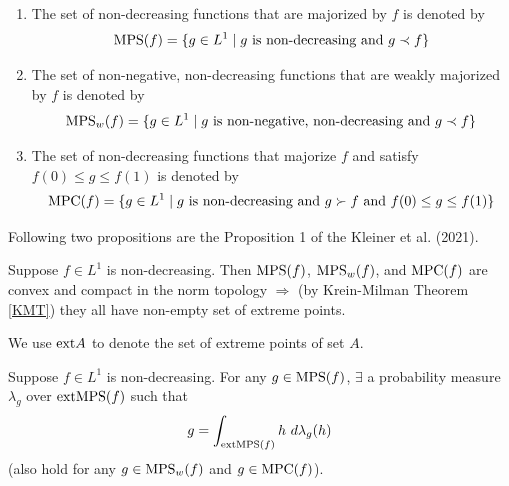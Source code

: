\documentclass[11pt]{elegantbook}
\begin{document}
\begin{definition}
    \normalfont
    \begin{enumerate}
        \item The set of non-decreasing functions that are majorized by $f$ is denoted by $$\textnormal{MPS}(f)=\{g\in L^1\mid g \textnormal{ is non-decreasing and }g\prec f\}$$
        \item The set of non-negative, non-decreasing functions that are weakly majorized by $f$ is denoted by $$\textnormal{MPS}_w(f)=\{g\in L^1\mid g \textnormal{ is non-negative,  non-decreasing and }g\prec f\}$$
        \item The set of non-decreasing functions that majorize $f$ and satisfy $f(0)\leq g\leq f(1)$ is denoted by $$\textnormal{MPC}(f)=\{g\in L^1\mid g \textnormal{ is non-decreasing and }g\succ f \textnormal{ and }f(0)\leq g\leq f(1)\}$$
    \end{enumerate}
\end{definition}

Following two propositions are the Proposition 1 of the Kleiner et al. (2021).
\begin{proposition}
    Suppose $f\in L^1$ is non-decreasing. Then $\textnormal{MPS}(f)$, $\textnormal{MPS}_w(f)$, and $\textnormal{MPC}(f)$ are convex and compact in the norm topology $\Rightarrow$ (by Krein-Milman Theorem \ref{KMT}) they all have non-empty set of extreme points.
\end{proposition}
\begin{note}
    We use $\textnormal{ext} A$ to denote the set of extreme points of set $A$.
\end{note}
\begin{proposition}
    Suppose $f\in L^1$ is non-decreasing. For any $g\in \textnormal{MPS}(f)$, $\exists$ a probability measure $\lambda_g$ over $\textnormal{ext} \textnormal{MPS}(f)$ such that $$g=\int_{\textnormal{ext} \textnormal{MPS}(f)}h\ d\lambda_g(h)$$
    (also hold for any $g\in \textnormal{MPS}_w(f)$ and $g\in \textnormal{MPC}(f)$).
\end{proposition}
\end{document}
